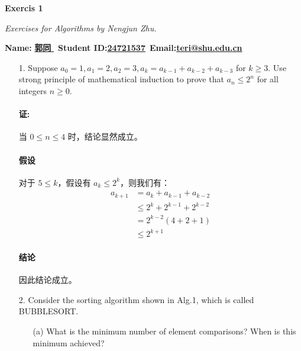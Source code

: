 \documentclass{article}
\begin{document}

\begin{center}
{\huge \textbf{Exercis 1}}

\textit{Exercises for Algorithms by Nengjun Zhu.}

\vspace{1em}
\textbf{Name:} \underline{\qquad \textbf{郭同} \qquad} \,
\textbf{Student ID:}\underline{\qquad \textbf{24721537}\qquad}\, 
\textbf{Email:}\underline{\qquad \textbf{teri@shu.edu.cn}\qquad}
\end{center}

\begin{itemize}

\item[1.] Suppose $a_0=1,  a_1=2, a_2=3, a_k=a_{k-1} + a_{k-2} + a_{k-3} $ for $k\geq 3$. Use strong principle of mathematical induction to prove that $a_n \leq 2^n$ for all integers $n\geq0$.





\noindent 

\paragraph{证:  } 当 $0 \leq n \leq 4$ 时，结论显然成立。

\paragraph{假设} 对于 $5 \leq k$，假设有 $a_k \leq 2^k$，则我们有：
\begin{align*}
    a_{k+1} &= a_k + a_{k-1} + a_{k-2} \\
            &\leq 2^k + 2^{k-1} + 2^{k-2} \\
            &= 2^{k-2} (4 + 2 + 1) \\
            &\leq 2^{k+1}
\end{align*}

\paragraph{结论} 因此结论成立。






\item[2.] {\large Consider the sorting algorithm shown in Alg.1, which is called BUBBLESORT.}
\begin{itemize}
\item[(a)] What is the minimum number of element comparisons? When is this minimum achieved?


\end{itemize}
\end{itemize}
\end{document}
